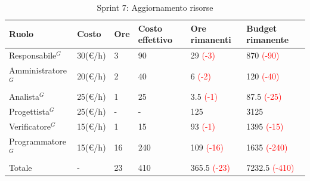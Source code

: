\begin{table}[H]
	\centering
	\begin{tabular}{|p{}|p{}|p{}|p{}|p{}|p{}|}
		\hline
		\rowcolor{gray!25}
		Ruolo & Costo & Ore & Costo \newline effettivo & Ore \newline rimanenti & Budget \newline rimanente \\ \hline
		
		Responsabile$^G$
		& 30(€/h) & 3 & 90
		& 29 \textcolor{red}{(-3)}
		& 870 \textcolor{red}{(-90)} \\ \hline
		
		Amministratore$^G$
		& 20(€/h) & 2 & 40
		& 6 \textcolor{red}{(-2)}
		& 120 \textcolor{red}{(-40)} \\ \hline
		
		Analista$^G$
		& 25(€/h) & 1 & 25
		& 3.5 \textcolor{red}{(-1)}
		& 87.5 \textcolor{red}{(-25)} \\ \hline
		
		Progettista$^G$
		& 25(€/h) & - & -
		& 125
		& 3125 \\ \hline
		
		Verificatore$^G$
		& 15(€/h) & 1 & 15
		& 93 \textcolor{red}{(-1)}
		& 1395 \textcolor{red}{(-15)} \\ \hline
		
		Programmatore$^G$
		& 15(€/h) & 16 & 240
		& 109 \textcolor{red}{(-16)}
		& 1635 \textcolor{red}{(-240)} \\ \hline
		
		Totale
		& - & 23 & 410
		& 365.5 \textcolor{red}{(-23)}
		& 7232.5 \textcolor{red}{(-410)} \\ \hline
	\end{tabular}
	\caption{Sprint 7: Aggiornamento risorse}
\end{table}